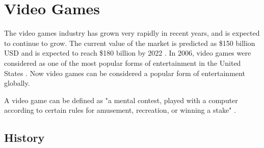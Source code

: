 \documentclass[a4paper,11.5pt]{report}
\numberwithin{figure}{section}
\numberwithin{table}{section}
\numberwithin{equation}{section}
\numberwithin{equation}{section}
\begin{document}
\section{Video Games}




The video games industry has grown very rapidly in recent years, and is expected to continue to grow. The current value of the market is predicted as \$150 billion USD and is expected to reach \$180 billion by 2022 \citep{vgamesResearch}. In 2006, video games were considered as one of the most popular forms of entertainment in the United States \citep{sherry2006, ritterfeld2006}. Now video games can be considered a popular form of entertainment globally.

A video game can be defined as "a mental contest, played with a computer according to certain rules for amusement, recreation, or winning a stake" \citep{Zyda2005}.


\subsection{History}

\end{document}

